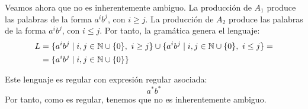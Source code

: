 \begin{ejercicio}
    Veamos ahora que no es inherentemente ambiguo. La producción de $A_1$ produce las palabras de la forma $a^i b^j$, con $i \geq j$. La producción de $A_2$ produce las palabras de la forma $a^i b^j$, con $i \leq j$. Por tanto, la gramática genera el lenguaje:
    \begin{align*}
        L &= \{ a^i b^j \mid i,j\in \mathbb{N}\cup \{0\},\ i \geq j\}\cup \{ a^i b^j \mid i,j\in \mathbb{N}\cup \{0\},\ i \leq j\} =\\&= \{ a^i b^j \mid i,j\in \mathbb{N}\cup \{0\} \}
    \end{align*}

    Este lenguaje es regular con expresión regular asociada:
    \begin{equation*}
        a^*b^*
    \end{equation*}
    Por tanto, como es regular, tenemos que no es inherentemente ambiguo.
\end{ejercicio}

